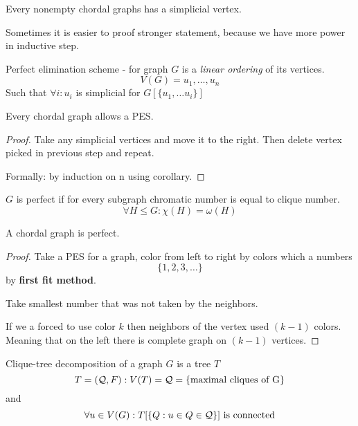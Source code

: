 \begin{corollary}
	Every nonempty chordal graphs has a simplicial vertex.
\end{corollary}

Sometimes it is easier to proof stronger statement, because we have more power in inductive step.

\begin{definition}[PES]
	Perfect elimination scheme - for graph $G$ is a \emph{linear ordering} of its vertices.
	\[ V(G) = u_1, \ldots, u_n\]
	Such that $\forall i: u_i$ is simplicial for $G[\{ u_1, \ldots u_i\}]$
\end{definition}

\begin{lemma}
	Every chordal graph allows a PES.
\end{lemma}
\begin{proof}
	Take any simplicial vertices and move it to the right.
	Then delete vertex picked in previous step and repeat.

	Formally: by induction on n using corollary.
\end{proof}

\begin{definition}
	$G$ is perfect if for every subgraph chromatic number is equal to clique number.
	\[ \forall H \leq G: \chi(H) = \omega(H) \]
\end{definition}

\begin{theorem}
	A chordal graph is perfect.
\end{theorem}
\begin{proof}
	Take a PES for a graph, color from left to right by colors which a numbers
	\[ \{ 1, 2, 3, \ldots \} \]
	by \textbf{first fit method}.

	Take smallest number that was not taken by the neighbors.

	If we a forced to use color $k$ then neighbors of the vertex used $(k - 1)$ colors.
	Meaning that on the left there is complete graph on $(k - 1)$ vertices.
\end{proof}

\begin{definition}
	Clique-tree decomposition of a graph $G$ is a tree $T$
	\[ T = (\operatorname{\mathcal{Q}}, F): V(T) = \operatorname{\mathcal{Q}} = \{\text{maximal cliques of G} \} \]
	and
	\[ \forall u \in V(G): T[ \{Q: u \in Q \in \operatorname{\mathcal{Q}} \}] \text{ is connected} \]
\end{definition}

